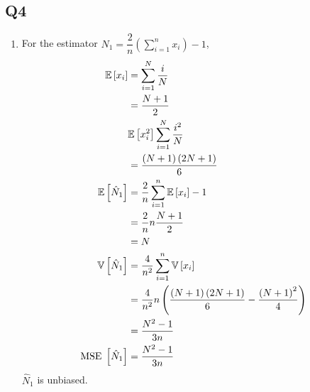 \documentclass{article}
\begin{document}
\subsection{Q4}
\begin{enumerate}
\item For the estimator $\hat{N}_{1} = \dfrac{2}{n} \left(\displaystyle\sum_{i=1}^{n} x_{i}\right) - 1$,
\begin{align*}
\mathbb{E}\left[x_{i}\right] &= \displaystyle\sum_{i=1}^{N} \dfrac{i}{N}
\\ &= \dfrac{N + 1}{2}
\\ &\mathbb{E}\left[x_{i}^{2}\right] \displaystyle\sum_{i=1}^{N} \dfrac{i^{2}}{N}
\\ &= \dfrac{\left(N + 1\right)\left(2 N + 1\right)}{6}
\\ \mathbb{E}\left[\hat{N}_{1}\right] &= \dfrac{2}{n} \displaystyle\sum_{i=1}^{n} \mathbb{E}\left[x_{i}\right] - 1
\\ &= \dfrac{2}{n} n \dfrac{N + 1}{2}
\\ &= N 
\\ \mathbb{V}\left[\hat{N}_{1}\right] &= \dfrac{4}{n^{2}} \displaystyle\sum_{i=1}^{n} \mathbb{V}\left[x_{i}\right]
\\ &= \dfrac{4}{n^{2}} n \left(\dfrac{\left(N + 1\right)\left(2 N + 1\right)}{6} - \dfrac{\left(N + 1\right)^{2}}{4}\right)
\\ &= \dfrac{N^{2} - 1}{3 n}
\\ \text{\;MSE\;} \left[\hat{N}_{1}\right] &= \dfrac{N^{2} - 1}{3 n}
\end{align*}
$\hat{N}_{1}$ is unbiased.


\end{enumerate}
\end{document}
